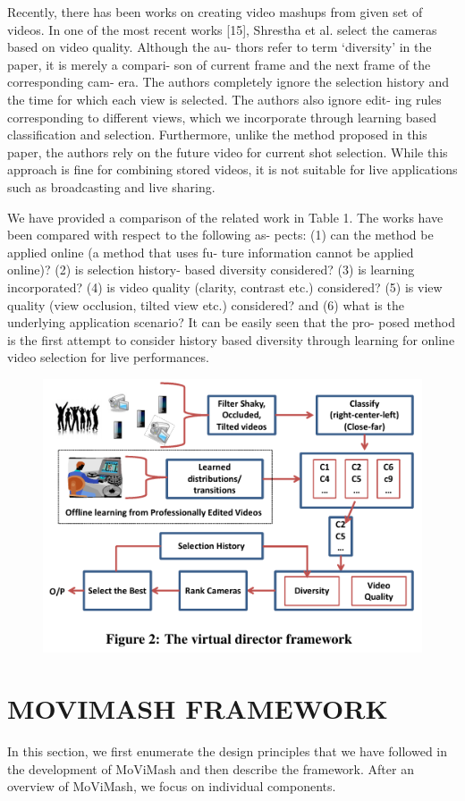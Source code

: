 \documentclass{sig-alternate}
\begin{document}
Recently, there has been works on creating video mashups from
given set of videos. In one of the most recent works [15], Shrestha
et al. select the cameras based on video quality. Although the au-
thors refer to term ‘diversity’ in the paper, it is merely a compari-
son of current frame and the next frame of the corresponding cam-
era. The authors completely ignore the selection history and the
time for which each view is selected. The authors also ignore edit-
ing rules corresponding to different views, which we incorporate
through learning based classification and selection. Furthermore,
unlike the method proposed in this paper, the authors rely on the
future video for current shot selection. While this approach is fine
for combining stored videos, it is not suitable for live applications
such as broadcasting and live sharing.

We have provided a comparison of the related work in Table 1.
The works have been compared with respect to the following as-
pects: (1) can the method be applied online (a method that uses fu-
ture information cannot be applied online)? (2) is selection history-
based diversity considered? (3) is learning incorporated? (4) is
video quality (clarity, contrast etc.) considered? (5) is view quality
(view occlusion, tilted view etc.) considered? and (6) what is the
underlying application scenario? It can be easily seen that the pro-
posed method is the first attempt to consider history based diversity
through learning for online video selection for live performances.
\begin{figure}{
\includegraphics{image3.pdf}}
\end{figure}
\section{MOVIMASH FRAMEWORK}
In this section, we first enumerate the design principles that we
have followed in the development of MoViMash and then describe
the framework. After an overview of MoViMash, we focus on individual components.
\end{document}
